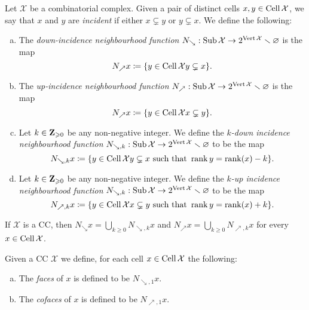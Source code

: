 \begin{definition}
\label{def:down/up-incidence-neighbourhood}
Let \(\mathcal{X}\) be a combinatorial complex. Given a pair of distinct cells
\(x, y \in \operatorname{Cell} \mathcal{X}\), we say that \(x\) and \(y\) are \emph{incident} if either
\(x \subsetneq y\) or \(y \subsetneq x\). We define the following:
\begin{enumerate}[(a)]\setlength\itemsep{0em}
\item The \emph{down-incidence neighbourhood function}
  \(N_{\searrow}: \operatorname{Sub} \mathcal{X} \to 2^{\operatorname{Vert} \mathcal{X}} \smallsetminus \varnothing\) is the map
  \[
  N_{\nearrow} x \coloneq \{y \in \operatorname{Cell} \mathcal{X} \relax y \subsetneq x\}.
  \]

\item The \emph{up-incidence neighbourhood function}
  \(N_{\nearrow}: \operatorname{Sub} \mathcal{X} \to 2^{\operatorname{Vert} \mathcal{X}} \smallsetminus \varnothing\) is the map
  \[
  N_{\nearrow} x \coloneq \{y \in \operatorname{Cell} \mathcal{X} \relax x \subsetneq y\}.
  \]

\item Let \(k \in \mathbf{Z}_{\geqslant 0}\) be any non-negative integer. We define the
  \emph{\(k\)-down incidence neighbourhood function}
  \(N_{\searrow, k}: \operatorname{Sub} \mathcal{X} \to 2^{\operatorname{Vert} \mathcal{X}} \smallsetminus \varnothing\) to be the map
  \[
  N_{\searrow, k} x \coloneq
  \{y \in \operatorname{Cell} \mathcal{X} \relax y \subsetneq x \text{ such that } \operatorname{rank} y = \operatorname{rank}(x) - k\}.
  \]

\item Let \(k \in \mathbf{Z}_{\geqslant 0}\) be any non-negative integer. We define the
  \emph{\(k\)-up incidence neighbourhood function}
  \(N_{\searrow, k}: \operatorname{Sub} \mathcal{X} \to 2^{\operatorname{Vert} \mathcal{X}} \smallsetminus \varnothing\) to be the map
  \[
  N_{\nearrow, k} x \coloneq
  \{y \in \operatorname{Cell} \mathcal{X} \relax x \subsetneq y \text{ such that } \operatorname{rank} y = \operatorname{rank}(x) + k\}.
  \]
\end{enumerate}
\end{definition}

\begin{corollary}
\label{cor:relation-down/up-to-k-down/up}
If \(\mathcal{X}\) is a CC, then \(N_{\searrow} x = \bigcup_{k \geq 0} N_{\searrow, k} x\) and \(N_{\nearrow} x = \bigcup_{k \geq
  0} N_{\nearrow, k} x\) for every \(x \in \operatorname{Cell} \mathcal{X}\).
\end{corollary}

\begin{definition}
\label{def:cc-cell-face-and-coface}
Given a CC \(\mathcal{X}\) we define, for each cell \(x \in \operatorname{Cell} \mathcal{X}\) the following:
\begin{enumerate}[(a)]\setlength\itemsep{0em}
\item The \emph{faces} of \(x\) is defined to be \(N_{\searrow, 1} x\).

\item The \emph{cofaces} of \(x\) is defined to be \(N_{\nearrow, 1} x\).
\end{enumerate}
\end{definition}

